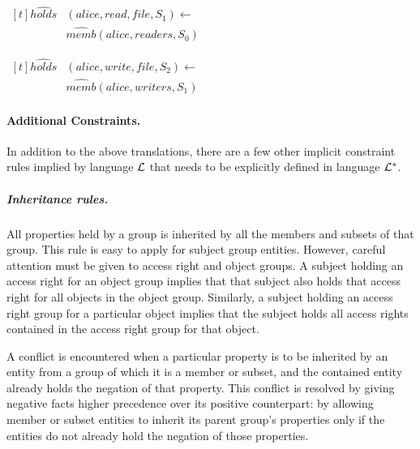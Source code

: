 \documentclass[11pt, twocolumn]{article}
\newenvironment{vquote}
  {\begin{list}{}{\leftmargin 1em}\item[]}
  {\end{list}}
\begin{document}
          \begin{vquote}
            \begin{math}
              \begin{aligned}[t]
                \hat{holds}&(alice, read, file, S_{1}) \leftarrow \\
                & \hat{memb}(alice, readers, S_{0})
              \end{aligned}
            \end{math}

            \begin{math}
              \begin{aligned}[t]
                \hat{holds}&(alice, write, file, S_{2}) \leftarrow \\
                & \hat{memb}(alice, writers, S_{1})
              \end{aligned}
            \end{math}
          \end{vquote}

        \paragraph{Additional Constraints.}

          In addition to the above translations, there are a few other implicit
          constraint rules implied by language ${\cal L}$ that needs to be
          explicitly defined in language ${\cal L}^{*}$.

          \subparagraph{Inheritance rules.}

            All properties held by a group is inherited by all the members and
            subsets of that group. This rule is easy to apply for subject group
            entities. However, careful attention must be given to access right
            and object groups. A subject holding an access right for an object
            group implies that that subject also holds that access right for
            all objects in the object group. Similarly, a subject holding an
            access right group for a particular object implies that the subject
            holds all access rights contained in the access right group for
            that object.

            A conflict is encountered when a particular property is to be
            inherited by an entity from a group of which it is a member or
            subset, and the contained entity already holds the negation of
            that property. This conflict is resolved by giving negative facts
            higher precedence over its positive counterpart: by allowing member
            or subset entities to inherit its parent group's properties only if
            the entities do not already hold the negation of those properties.
\end{document}
